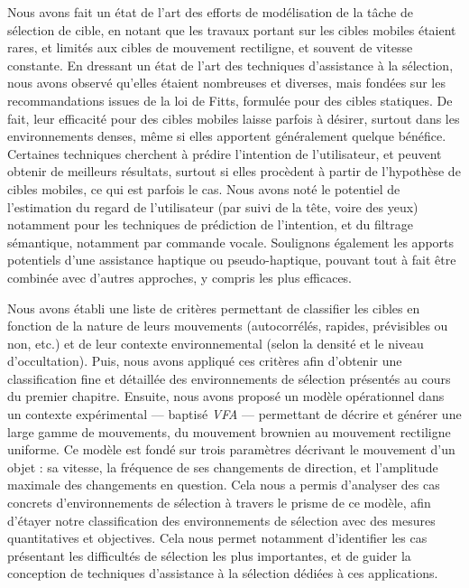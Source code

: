 	Nous avons fait un état de l'art des efforts de modélisation de la tâche de sélection de cible, en notant que les travaux portant sur les cibles mobiles étaient rares, et limités aux cibles de mouvement rectiligne, et souvent de vitesse constante. En dressant un état de l'art des techniques d'assistance à la sélection, nous avons observé qu'elles étaient nombreuses et diverses, mais fondées sur les recommandations issues de la loi de Fitts, formulée pour des cibles statiques. De fait, leur efficacité pour des cibles mobiles laisse parfois à désirer, surtout dans les environnements denses, même si elles apportent généralement quelque bénéfice. Certaines techniques cherchent à prédire l'intention de l'utilisateur, et peuvent obtenir de meilleurs résultats, surtout si elles procèdent à partir de l'hypothèse de cibles mobiles, ce qui est parfois le cas. Nous avons noté le potentiel de l'estimation du regard de l'utilisateur (par suivi de la tête, voire des yeux) notamment pour les techniques de prédiction de l'intention, et du filtrage sémantique, notamment par commande vocale. Soulignons également les apports potentiels d'une assistance haptique ou pseudo-haptique, pouvant tout à fait être combinée avec d'autres approches, y compris les plus efficaces.
	
	Nous avons établi une liste de critères permettant de classifier les cibles en fonction de la nature de leurs mouvements (autocorrélés, rapides, prévisibles ou non, etc.) et de leur contexte environnemental (selon la densité et le niveau d'occultation). Puis, nous avons appliqué ces critères afin d'obtenir une classification fine et détaillée des environnements de sélection présentés au cours du premier chapitre. Ensuite, nous avons proposé un modèle opérationnel dans un contexte expérimental --- baptisé \emph{VFA} --- permettant de décrire et générer une large gamme de mouvements, du mouvement brownien au mouvement rectiligne uniforme. Ce modèle est fondé sur trois paramètres décrivant le mouvement d'un objet : sa vitesse, la fréquence de ses changements de direction, et l'amplitude maximale des changements en question. Cela nous a permis d'analyser des cas concrets d'environnements de sélection à travers le prisme de ce modèle, afin d'étayer notre classification des environnements de sélection avec des mesures quantitatives et objectives. Cela nous permet notamment d'identifier les cas présentant les difficultés de sélection les plus importantes, et de guider la conception de techniques d'assistance à la sélection dédiées à ces applications.
	
